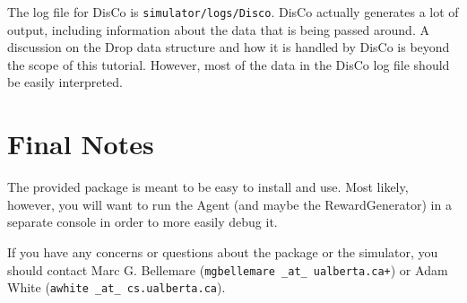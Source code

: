 \documentclass[12pt]{article}
\begin{document}
The log file for DisCo is \verb+simulator/logs/Disco+. DisCo actually generates 
a lot of output, including information about the data
that is being passed around. A discussion on the Drop data structure and how 
it is handled by DisCo is beyond the scope of this tutorial. However, most of 
the data in the DisCo log file should be easily interpreted.

\section{Final Notes}

The provided package is meant to be easy to install and use. Most likely,
however, you will want to run the Agent (and maybe the RewardGenerator) in
a separate console in order to more easily debug it.

If you have any concerns or questions about the package or the simulator,
you should contact Marc G. Bellemare (\texttt{mgbellemare \_at\_ ualberta.ca+}) or Adam White (\texttt{awhite \_at\_ cs.ualberta.ca}).
\end{document}

